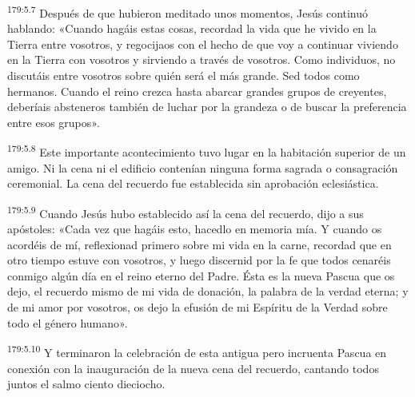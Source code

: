 \par 
\textsuperscript{179:5.7} Después de que hubieron meditado unos momentos, Jesús continuó hablando: «Cuando hagáis estas cosas, recordad la vida que he vivido en la Tierra entre vosotros, y regocijaos con el hecho de que voy a continuar viviendo en la Tierra con vosotros y sirviendo a través de vosotros. Como individuos, no discutáis entre vosotros sobre quién será el más grande. Sed todos como hermanos. Cuando el reino crezca hasta abarcar grandes grupos de creyentes, deberíais absteneros también de luchar por la grandeza o de buscar la preferencia entre esos grupos».

\par 
\textsuperscript{179:5.8} Este importante acontecimiento tuvo lugar en la habitación superior de un amigo. Ni la cena ni el edificio contenían ninguna forma sagrada o consagración ceremonial. La cena del recuerdo fue establecida sin aprobación eclesiástica.

\par 
\textsuperscript{179:5.9} Cuando Jesús hubo establecido así la cena del recuerdo, dijo a sus apóstoles: «Cada vez que hagáis esto, hacedlo en memoria mía. Y cuando os acordéis de mí, reflexionad primero sobre mi vida en la carne, recordad que en otro tiempo estuve con vosotros, y luego discernid por la fe que todos cenaréis conmigo algún día en el reino eterno del Padre. Ésta es la nueva Pascua que os dejo, el recuerdo mismo de mi vida de donación, la palabra de la verdad eterna; y de mi amor por vosotros, os dejo la efusión de mi Espíritu de la Verdad sobre todo el género humano».

\par 
\textsuperscript{179:5.10} Y terminaron la celebración de esta antigua pero incruenta Pascua en conexión con la inauguración de la nueva cena del recuerdo, cantando todos juntos el salmo ciento dieciocho.